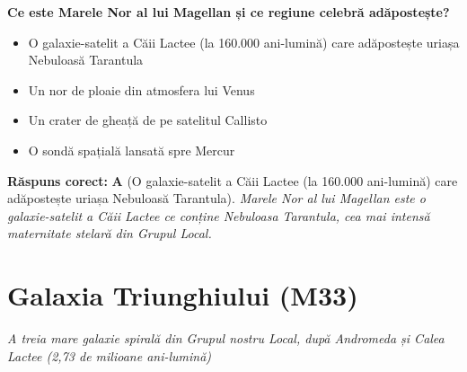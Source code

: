 \vspace{6pt}
\begin{tcolorbox}[orbitarquiz, title={\textbf{Întrebare de verificare \#71: Marele Nor al lui Magellan}}]
\textbf{Ce este Marele Nor al lui Magellan și ce regiune celebră adăpostește?}
\begin{itemize}[leftmargin=2.2em, itemsep=2pt, topsep=4pt]
  \item[$\square$ \textbf{A.}] O galaxie-satelit a Căii Lactee (la 160.000 ani-lumină) care adăpostește uriașa Nebuloasă Tarantula
  \item[$\square$ \textbf{B.}] Un nor de ploaie din atmosfera lui Venus
  \item[$\square$ \textbf{C.}] Un crater de gheață de pe satelitul Callisto
  \item[$\square$ \textbf{D.}] O sondă spațială lansată spre Mercur
\end{itemize}
\vspace{2pt}
{\footnotesize\color{orbitarMuted}\textbf{Răspuns corect:} \textbf{A} (O galaxie-satelit a Căii Lactee (la 160.000 ani-lumină) care adăpostește uriașa Nebuloasă Tarantula). \emph{Marele Nor al lui Magellan este o galaxie-satelit a Căii Lactee ce conține Nebuloasa Tarantula, cea mai intensă maternitate stelară din Grupul Local.}}
\end{tcolorbox}
\clearpage


\section{Galaxia Triunghiului (M33)}
\label{sec:body-triangulum_galaxy}
\vspace{-4pt}
{\large\itshape\color{orbitarAccent} A treia mare galaxie spirală din Grupul nostru Local, după Andromeda și Calea Lactee (2,73 de milioane ani-lumină)}\\[4pt]



